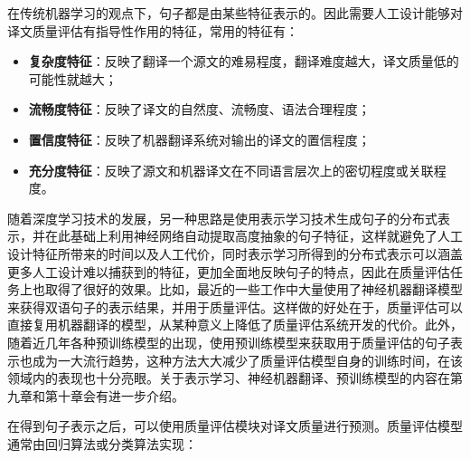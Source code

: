 \parinterval 在传统机器学习的观点下，句子都是由某些特征表示的。因此需要人工设计能够对译文质量评估有指导性作用的特征，常用的特征有：

\begin{itemize}
\vspace{0.5em}
\item {\small\sffamily\bfseries{复杂度特征}}：反映了翻译一个源文的难易程度，翻译难度越大，译文质量低的可能性就越大；
\vspace{0.5em}
\item {\small\sffamily\bfseries{流畅度特征}}：反映了译文的自然度、流畅度、语法合理程度；
\vspace{0.5em}
\item {\small\sffamily\bfseries{置信度特征}}：反映了机器翻译系统对输出的译文的置信程度；
\vspace{0.5em}
\item {\small\sffamily\bfseries{充分度特征}}：反映了源文和机器译文在不同语言层次上的密切程度或关联程度。
\vspace{0.5em}
\end{itemize}
\parinterval 随着深度学习技术的发展，另一种思路是使用表示学习技术生成句子的分布式表示，并在此基础上利用神经网络自动提取高度抽象的句子特征，这样就避免了人工设计特征所带来的时间以及人工代价，同时表示学习所得到的分布式表示可以涵盖更多人工设计难以捕获到的特征，更加全面地反映句子的特点，因此在质量评估任务上也取得了很好的效果。比如，最近的一些工作中大量使用了神经机器翻译模型来获得双语句子的表示结果，并用于质量评估。这样做的好处在于，质量评估可以直接复用机器翻译的模型，从某种意义上降低了质量评估系统开发的代价。此外，随着近几年各种预训练模型的出现，使用预训练模型来获取用于质量评估的句子表示也成为一大流行趋势，这种方法大大减少了质量评估模型自身的训练时间，在该领域内的表现也十分亮眼。关于表示学习、神经机器翻译、预训练模型的内容在第九章和第十章会有进一步介绍。

\parinterval 在得到句子表示之后，可以使用质量评估模块对译文质量进行预测。质量评估模型通常由回归算法或分类算法实现：

